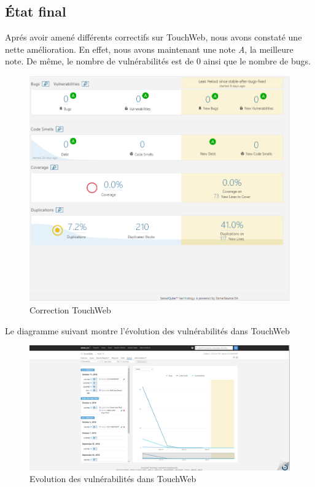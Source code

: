 \subsection{État final}
Aprés avoir amené différents correctifs sur TouchWeb, nous avons constaté une nette amélioration.
En effet, nous avons maintenant une note \textit{A}, la meilleure note. De même, le nombre de vulnérabilités est de 0 ainsi que le nombre de bugs.
\begin{figure}[H]
	\centering
	\begin{minipage}{12cm}
		\centering
		\includegraphics[width=1\textwidth]{fig/Capture1.PNG}
	\end{minipage}
	\caption{Correction TouchWeb}
	\label{fig:sfds}
\end{figure}
Le diagramme suivant montre l'évolution des vulnérabilités dans TouchWeb
\begin{figure}[H]
	\centering
	\begin{minipage}{12cm}
		\centering
		\includegraphics[width=1\textwidth]{fig/issues_diagram.png}
	\end{minipage}
	\caption{Evolution des vulnérabilités dans TouchWeb}
	\label{fig:sfds}
\end{figure}
